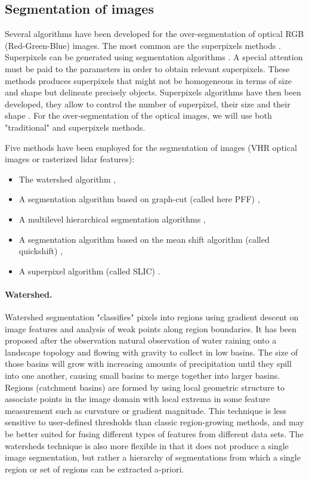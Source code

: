 \subsection{Segmentation of images}
Several algorithms have been developed for the over-segmentation of optical RGB (Red-Green-Blue) images. The most common are the superpixels methods \citep{achanta2012slic}. Superpixels can be generated using segmentation algorithms \citep{shi2000normalized, felzenszwalb2004efficient, comaniciu2002mean, vedaldi2008quick, vincent1991watersheds}. A special attention must be paid to the parameters in order to obtain relevant superpixels. These methods produces superpixels that might not be homogeneous in terms of size and shape but delineate precisely objects.
Superpixels algorithms have then been developed, they allow to control the number of superpixel, their size and their shape \citep{moore2008superpixel, veksler2010superpixels, levinshtein2009turbopixels, achanta2012slic}.
For the over-segmentation of the optical images, we will use both "traditional" and superpixels methods.

Five methods have been employed for the segmentation of images (VHR optical images or rasterized lidar features):
\begin{itemize}
\item The watershed algorithm \citep{vincent1991watersheds},
\item A segmentation algorithm based on graph-cut (called here PFF) \citep{felzenszwalb2004efficient},
\item A multilevel hierarchical segmentation algorithms \citep{guigues2006scale},
\item A segmentation algorithm based on the mean shift algorithm (called quickshift) \citep{vedaldi2008quick},
\item A superpixel algorithm (called SLIC) \citep{achanta2012slic}.
\end{itemize}

\paragraph{Watershed. \\}
Watershed segmentation "classifies" pixels into regions using gradient descent on image features and analysis of weak points along region boundaries. It has been proposed after the observation natural observation of water raining onto a landscape topology and flowing with gravity to collect in low basins. The size of those basins will grow with increasing amounts of precipitation until they spill into one another, causing small basins to merge together into larger basins. Regions (catchment basins) are formed by using local geometric structure to associate points in the image domain with local extrema in some feature measurement such as curvature or gradient magnitude. This technique is less sensitive to user-defined thresholds than classic region-growing methods, and may be better suited for fusing different types of features from different data sets. The watersheds technique is also more flexible in that it does not produce a single image segmentation, but rather a hierarchy of segmentations from which a single region or set of regions can be extracted a-priori.

